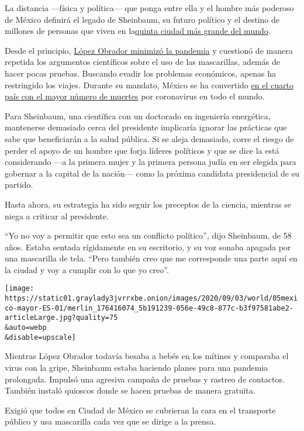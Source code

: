 La distancia ---física y política--- que ponga entre ella y el hombre
más poderoso de México definirá el legado de Sheinbaum, su futuro
político y el destino de millones de personas que viven en
la\href{https://worldpopulationreview.com/world-cities}{quinta ciudad
más grande del mundo}.

Desde el principio,
\href{https://www.nytimes3xbfgragh.onion/es/2020/05/08/espanol/america-latina/mexico-coronavirus.html}{López
Obrador minimizó la pandemia} y cuestionó de manera repetida los
argumentos científicos sobre el uso de las mascarillas, además de hacer
pocas pruebas. Buscando evadir los problemas económicos, apenas ha
restringido los viajes. Durante su mandato, México se ha convertido
\href{https://www.nytimes3xbfgragh.onion/es/interactive/2020/espanol/america-latina/coronavirus-en-mexico.html}{en
el cuarto país con el mayor número de muertes} por coronavirus en todo
el mundo.

Para Sheinbaum, una científica con un doctorado en ingeniería
energética, mantenerse demasiado cerca del presidente implicaría ignorar
las prácticas que sabe que beneficiarán a la salud pública. Si se aleja
demasiado, corre el riesgo de perder el apoyo de un hombre que forja
líderes políticos y que se dice la está considerando ---a la primera
mujer y la primera persona judía en ser elegida para gobernar a la
capital de la nación--- como la próxima candidata presidencial de su
partido.

Hasta ahora, su estrategia ha sido seguir los preceptos de la ciencia,
mientras se niega a criticar al presidente.

``Yo no voy a permitir que esto sea un conflicto político'', dijo
Sheinbaum, de 58 años. Estaba sentada rígidamente en su escritorio, y su
voz sonaba apagada por una mascarilla de tela. ``Pero también creo que
me corresponde una parte aquí en la ciudad y voy a cumplir con lo que yo
creo''.

\texttt{[image: https://static01.graylady3jvrrxbe.onion/images/2020/09/03/world/05mexico-mayor-ES-01/merlin\_176416074\_5b191239-056e-49c8-877c-b3f97581abe2-articleLarge.jpg?quality=75\\\&auto=webp\\\&disable=upscale]}

Mientras López Obrador todavía besaba a bebés en los mítines y comparaba
el virus con la gripe, Sheinbaum estaba haciendo planes para una
pandemia prolongada. Impulsó una agresiva campaña de pruebas y rastreo
de contactos. También instaló quioscos donde se hacen pruebas de manera
gratuita.

Exigió que todos en Ciudad de México se cubrieran la cara en el
transporte público y usa mascarilla cada vez que se dirige a la prensa.

